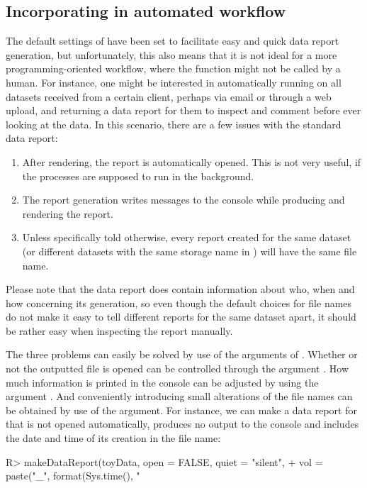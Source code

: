 \documentclass[article,shortnames]{jss}
\begin{document}
\subsection[Incorporating dataMaid in an automated workflow]{Incorporating  in automated workflow}
The default settings of  have been set to facilitate easy and quick data report generation, but unfortunately, this also means that it is not ideal for a more programming-oriented workflow, where the function might not be called by a human. For instance, one might be interested in automatically running  on all datasets received from a certain client, perhaps via email or through a web upload, and returning a data report for them to inspect and comment before ever looking at the data. In this scenario, there are a few issues with the standard data report:
\begin{enumerate}
\item After rendering, the report is automatically opened. This is not very useful, if the processes are supposed to run in the background.
\item The report generation writes messages to the console while producing and rendering the report.
\item Unless specifically told otherwise, every report created for the same dataset (or different datasets with the same storage name in ) will have the same file name.
\end{enumerate}
Please note that the data report does contain information about who, when and how concerning its generation, so even though the default choices for file names do not make it easy to tell different reports for the same dataset apart, it should be rather easy when inspecting the report manually. 

The three problems can easily be solved by use of the arguments of . Whether or not the outputted file is opened can be controlled through the argument . How much information is printed in the console can be adjusted by using the argument . And conveniently introducing small alterations of the file names can be obtained by use of the  argument. For instance, we can make a data report for  that is not opened automatically, produces no output to the console and includes the date and time of its creation in the file name:

\begin{Schunk}
\begin{Sinput}
R> makeDataReport(toyData, open = FALSE, quiet = "silent",
+    vol = paste("_", format(Sys.time(), "%
\end{Sinput}
\end{Schunk}
\end{document}
